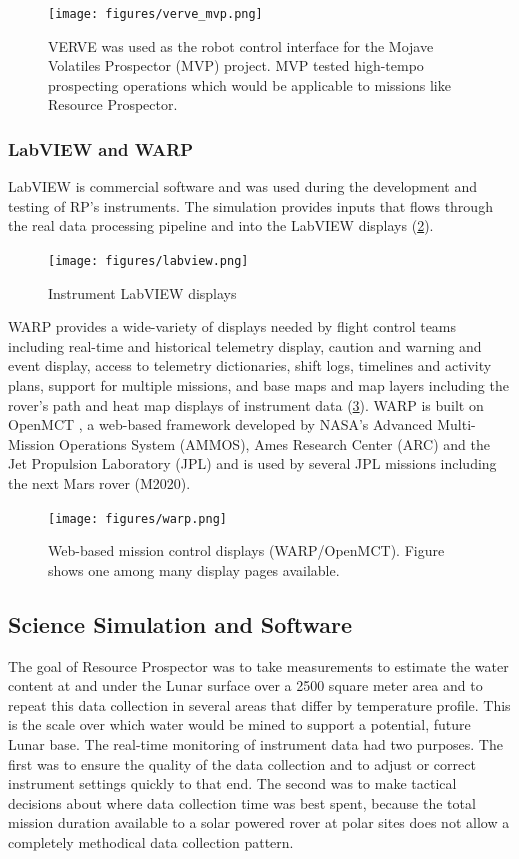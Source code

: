 \documentclass[twocolumn,letterpaper]{IEEEAerospaceCLS}  %
\begin{document}
\begin{figure}[htp!]
\centering
\texttt{[image: figures/verve\_mvp.png]}
\caption{VERVE was used as the robot control interface for the Mojave Volatiles Prospector (MVP) project.  MVP tested high-tempo prospecting operations which would be applicable to missions like Resource Prospector.}
\label{fig:verve-mvp}
\end{figure}

\subsubsection{LabVIEW and WARP}

LabVIEW\cite{labview2018} is commercial software and was used during the development and testing of RP's instruments.
The simulation provides inputs that flows through the real data processing pipeline and into the LabVIEW displays (\cref{fig:labview}).

\begin{figure}[h!]
  \texttt{[image: figures/labview.png]}
  \caption{Instrument LabVIEW displays}
  \label{fig:labview}
\end{figure}

WARP \cite{trimble2016open} provides a wide-variety of displays needed by flight control teams including real-time and historical telemetry display, caution and warning and event display, access to telemetry dictionaries, shift logs, timelines and activity plans, support for multiple missions, and base maps and map layers including the rover's path and heat map displays of instrument data (\cref{fig:warp}).
WARP is built on OpenMCT \cite{OpenMCT}, a web-based framework developed by NASA’s Advanced Multi-Mission Operations System (AMMOS), Ames Research Center (ARC) and the Jet Propulsion Laboratory (JPL) and is used by several JPL missions including the next Mars rover (M2020).

\begin{figure}[h!]
  \texttt{[image: figures/warp.png]}
  \caption{Web-based mission control displays (WARP/OpenMCT).  Figure shows one among many display pages available.}
  \label{fig:warp}
\end{figure}

\subsection{Science Simulation and Software}

The goal of Resource Prospector was to take measurements to estimate the water content at and under the Lunar surface over a 2500 square meter area and to repeat this data collection in several areas that differ by temperature profile.  
This is the scale over which water would be mined to support a potential, future Lunar base.  
The real-time monitoring of instrument data had two purposes.  
The first was to ensure the quality of the data collection and to adjust or correct instrument settings quickly to that end.  
The second was to make tactical decisions about where data collection time was best spent, because the total mission duration available to a solar powered rover at polar sites does not allow a completely methodical data collection pattern.
\end{document}
